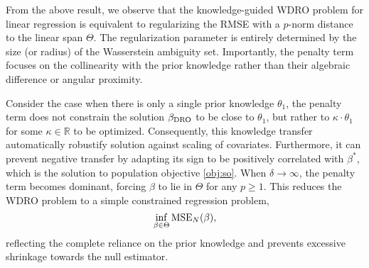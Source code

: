 \documentclass[12pt]{article}
\begin{document}
From the above result, we observe that the knowledge-guided WDRO problem for linear regression is equivalent to regularizing the RMSE with a $p$-norm distance to the linear span $\Theta$. The regularization parameter is entirely determined by the size (or radius) of the Wasserstein ambiguity set. Importantly, the penalty term focuses on the collinearity with the prior knowledge rather than their algebraic difference or angular proximity.

Consider the case when there is only a single prior knowledge $\theta_1$, the penalty term does not constrain the solution $\beta_{\rm DRO}$ to be close to $\theta_1$, but rather to $\kappa \cdot \theta_1$ for some $\kappa \in \mathbb{R}$ to be optimized. Consequently, this knowledge transfer automatically robustify solution against scaling of covariates. Furthermore, it can prevent negative transfer by adapting its sign to be positively correlated with $\beta^*$, which is the solution to population objective \eqref{obj:so}. When $\delta \to \infty$, the penalty term becomes dominant, forcing $\beta$ to lie in $\Theta$ for any $p \geq 1$. This reduces the WDRO problem to a simple constrained regression problem,
\[
\inf_{\beta \in \Theta} {\rm MSE}_N(\beta), 
\]
reflecting the complete reliance on the prior knowledge and prevents excessive shrinkage towards the null estimator.
\end{document}
